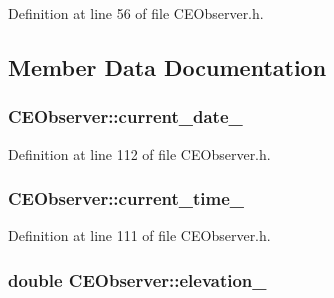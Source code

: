 Definition at line 56 of file C\+E\+Observer.\+h.



\subsection{Member Data Documentation}
\hypertarget{class_c_e_observer_aa1ab88ae5f08deba1fccb5d30502300d}{}
\subsubsection[{current\+\_\+date\+\_\+}]{ C\+E\+Observer\+::current\+\_\+date\+\_\+\hspace{0.3cm}{\ttfamily [protected]}}\label{class_c_e_observer_aa1ab88ae5f08deba1fccb5d30502300d}


Definition at line 112 of file C\+E\+Observer.\+h.

\hypertarget{class_c_e_observer_ab0148e7d53a311c489ed8094007a2ea6}{}
\subsubsection[{current\+\_\+time\+\_\+}]{ C\+E\+Observer\+::current\+\_\+time\+\_\+\hspace{0.3cm}{\ttfamily [protected]}}\label{class_c_e_observer_ab0148e7d53a311c489ed8094007a2ea6}


Definition at line 111 of file C\+E\+Observer.\+h.

\hypertarget{class_c_e_observer_accfa8a32945d78ce4d17378be68ef364}{}
\subsubsection[{elevation\+\_\+}]{\setlength{\rightskip}{0pt plus 5cm}double C\+E\+Observer\+::elevation\+\_\+\hspace{0.3cm}{\ttfamily [protected]}}\label{class_c_e_observer_accfa8a32945d78ce4d17378be68ef364}


